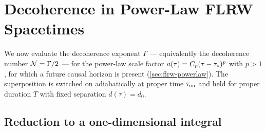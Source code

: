 
\section{Decoherence in Power-Law FLRW Spacetimes}
\label{sec:powerlaw}

We now evaluate the decoherence exponent $\Gamma$ — equivalently the decoherence
number $\mathcal{N} = \Gamma/2$ — for the power-law scale factor
$a(\tau) = C_{p}(\tau - \tau_{*})^{p}$ with $p > 1$, for which a future
causal horizon is present (\cref{sec:flrw-powerlaw}).  The superposition is
switched on adiabatically at proper time $\tau_{\rm on}$ and held for proper
duration $T$ with fixed separation $d(\tau) = d_{0}$.

\subsection{Reduction to a one-dimensional integral}
\label{sec:powerlaw-setup}

